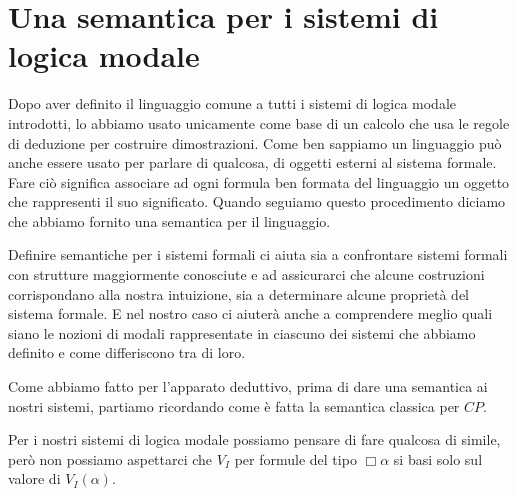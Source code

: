 \documentclass[a4paper, titlepage, 12pt]{report}
\begin{document}
%
%
%
%
%
%
\section{Una semantica per i sistemi di logica modale}
Dopo aver definito il linguaggio comune a tutti i sistemi di logica modale introdotti,
lo abbiamo usato unicamente come base di un calcolo che usa le regole di deduzione per costruire
dimostrazioni. Come ben sappiamo un linguaggio può anche essere usato per parlare di qualcosa,
di oggetti esterni al sistema formale.
Fare ciò significa associare ad ogni formula ben formata del linguaggio un oggetto
che rappresenti il suo significato.
Quando seguiamo questo procedimento diciamo che abbiamo fornito una semantica per il linguaggio.

Definire semantiche per i sistemi formali ci aiuta sia a confrontare sistemi formali
con strutture maggiormente conosciute e ad assicurarci
che alcune costruzioni corrispondano alla nostra intuizione,
sia a determinare alcune proprietà del sistema formale. E nel nostro caso ci aiuterà anche
a comprendere meglio quali siano le nozioni di modali rappresentate in ciascuno dei sistemi
che abbiamo definito e come differiscono tra di loro.


Come abbiamo fatto per l'apparato deduttivo, prima di dare una semantica ai nostri sistemi,
partiamo ricordando come è fatta la semantica classica per $CP$.

Per i nostri sistemi di logica modale possiamo pensare di fare qualcosa di simile,
però non possiamo aspettarci che $V_I$ per formule del tipo $\Box \alpha$ si basi solo
sul valore di $V_I(\alpha)$.
\end{document}
